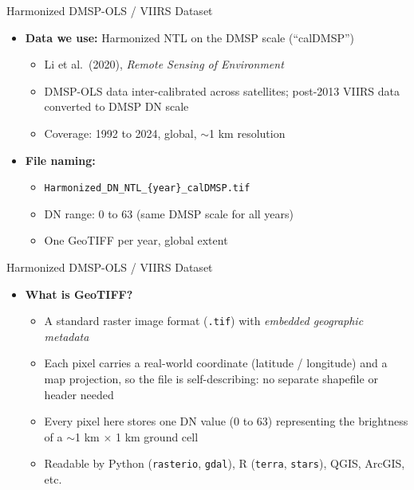 \documentclass[dvipsnames,hyperref={pdfpagelabels=false}]{beamer}
\begin{document}
\begin{frame}{Harmonized DMSP-OLS / VIIRS Dataset}
\begin{itemize}
  \item \textbf{Data we use:} Harmonized NTL on the DMSP scale
        (``calDMSP'')
  \vspace{0.2cm}
  \begin{itemize}
    \item Li et al.\ (2020), \textit{Remote Sensing of Environment}
    \vspace{0.1cm}
    \item DMSP-OLS data inter-calibrated across satellites;
          post-2013 VIIRS data converted to DMSP DN scale
    \vspace{0.1cm}
    \item Coverage: 1992 to 2024, global, $\sim$1 km resolution
  \end{itemize}
  \vspace{0.3cm}
  \item \textbf{File naming:}
  \vspace{0.1cm}
  \begin{itemize}
    \item \texttt{Harmonized\_DN\_NTL\_\{year\}\_calDMSP.tif}
    \vspace{0.1cm}
    \item DN range: 0 to 63 (same DMSP scale for all years)
    \vspace{0.1cm}
    \item One GeoTIFF per year, global extent
  \end{itemize}
\end{itemize}
\end{frame}

\begin{frame}{Harmonized DMSP-OLS / VIIRS Dataset}
\begin{itemize}
  \item \textbf{What is GeoTIFF?}
  \vspace{0.15cm}
  \begin{itemize}
    \item A standard raster image format (\texttt{.tif}) with
          \emph{embedded geographic metadata}
    \vspace{0.1cm}
    \item Each pixel carries a real-world coordinate
          (latitude / longitude) and a map projection,
          so the file is self-describing: no separate
          shapefile or header needed
    \vspace{0.1cm}
    \item Every pixel here stores one DN value (0 to 63)
          representing the brightness of a
          ${\sim}$1 km $\times$ 1 km ground cell
    \vspace{0.1cm}
    \item Readable by Python (\texttt{rasterio},
          \texttt{gdal}), R (\texttt{terra}, \texttt{stars}),
          QGIS, ArcGIS, etc.
  \end{itemize}
\end{itemize}
\end{frame}
\end{document}
